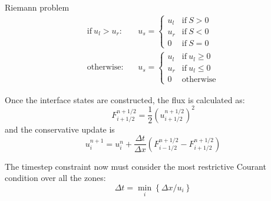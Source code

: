 \documentclass[11pt]{article}
\begin{document}
Riemann problem
\begin{eqnarray}
\mathrm{if~} u_l > u_r:&& u_s = \left \{ \begin{array}{cl}
                u_l & \mathrm{if~} S > 0 \\ 
                u_r & \mathrm{if~} S < 0 \\
                0   & \mathrm{if~} S = 0 \end{array} \right .   \\[1em]
%
\mathrm{otherwise:}&& u_s = \left \{ \begin{array}{clc}
                u_l & \mathrm{if~} u_l \ge 0 \\  
                u_r & \mathrm{if~} u_l \le 0 \\  
                0   & \mathrm{otherwise} \end{array} \right .   
\end{eqnarray}
               
Once the interface states are constructed, the flux is calculated as:
\begin{equation}
F^{n+1/2}_{i+1/2} = \frac{1}{2} \left (u_{i+1/2}^{n+1/2} \right )^2
\end{equation}
and the conservative update is
\begin{equation}
u_i^{n+1} = u_i^n + \frac{\Delta t}{\Delta x} 
   \left ( F_{i-1/2}^{n+1/2} - F_{i+1/2}^{n+1/2} \right )
\end{equation}

The timestep constraint now must consider the most restrictive Courant 
condition over all the zones:
\begin{equation}
\Delta t = \min_i \left \{ \Delta x / u_i \right \}
\end{equation}
\end{document}
